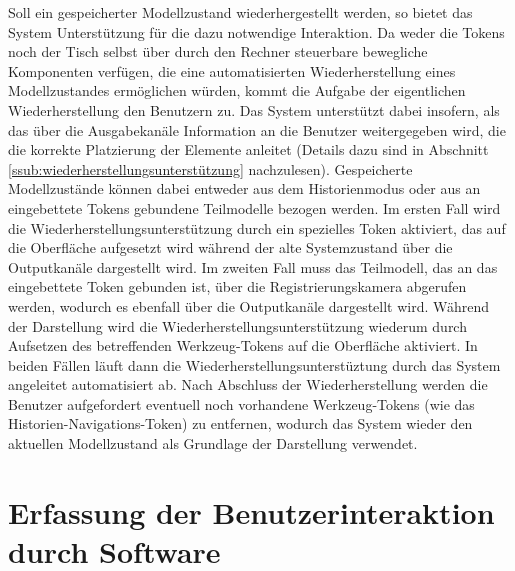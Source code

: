 Soll ein gespeicherter Modellzustand wiederhergestellt werden, so bietet das System Unterstützung für die dazu notwendige Interaktion. Da weder die Tokens noch der Tisch selbst über durch den Rechner steuerbare bewegliche Komponenten verfügen, die eine automatisierten Wiederherstellung eines Modellzustandes ermöglichen würden, kommt die Aufgabe der eigentlichen Wiederherstellung den Benutzern zu. Das System unterstützt dabei insofern, als das über die Ausgabekanäle Information an die Benutzer weitergegeben wird, die die korrekte Platzierung der Elemente anleitet (Details dazu sind in Abschnitt \ref{ssub:wiederherstellungsunterstützung} nachzulesen). Gespeicherte Modellzustände können dabei entweder aus dem Historienmodus oder aus an eingebettete Tokens gebundene Teilmodelle bezogen werden. Im ersten Fall wird die Wiederherstellungsunterstützung durch ein spezielles Token aktiviert, das auf die Oberfläche aufgesetzt wird während der alte Systemzustand über die Outputkanäle dargestellt wird. Im zweiten Fall muss das Teilmodell, das an das eingebettete Token gebunden ist, über die Registrierungskamera abgerufen werden, wodurch es ebenfall über die Outputkanäle dargestellt wird. Während der Darstellung wird die Wiederherstellungsunterstützung wiederum durch Aufsetzen des betreffenden Werkzeug-Tokens auf die Oberfläche aktiviert. In beiden Fällen läuft dann die Wiederherstellungsunterstüztung durch das System angeleitet automatisiert ab. Nach Abschluss der Wiederherstellung werden die Benutzer aufgefordert eventuell noch vorhandene Werkzeug-Tokens (wie das Historien-Navigations-Token) zu entfernen, wodurch das System wieder den aktuellen Modellzustand als Grundlage der Darstellung verwendet.
 


\section{Erfassung der Benutzerinteraktion durch Software} %
\label{sec:erfassung_der_benutzerinteraktion_durch_softfware}

